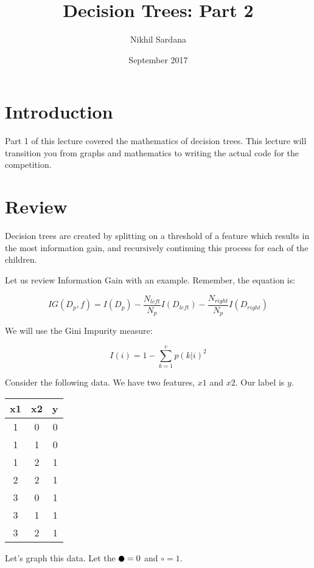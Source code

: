 \documentclass{article}
\title{Decision Trees: Part 2}
\author{Nikhil Sardana}
\date{September 2017}
\begin{document}
\maketitle

\section{Introduction}
Part 1 of this lecture covered the mathematics of decision trees. This lecture will transition you from graphs and mathematics to writing the actual code for the competition.

\section{Review}

Decision trees are created by splitting on a threshold of a feature which results in the most information gain, and recursively continuing this process for each of the children. 

Let us review Information Gain with an example. Remember, the equation is:

\[IG(D_p, f) = I(D_p) - \frac{N_{left}}{N_p}I(D_{left}) - \frac{N_{right}}{N_p}I(D_{right}) \]

We will use the Gini Impurity measure:

\[I(i) = 1 - \sum_{k=1}^{c} p(k|i)^2 \]


Consider the following data. We have two features, $x1$ and $x2$. Our label is $y$.

\begin{center}
\begin{tabular}{ |c|c|c| } 
 \hline
 x1 & x2 & y \\
 \hline
 1 & 0 & 0 \\ 
 1 & 1 & 0 \\ 
 1 & 2 & 1 \\ 
 2 & 2 & 1 \\ 
 3 & 0 & 1 \\
 3 & 1 & 1 \\
 3 & 2 & 1 \\

 \hline
\end{tabular}
\end{center}
Let's graph this data. Let the $ \newmoon = 0$ and $\circ = 1$.
\begin{center}
\end{center}
\end{document}
